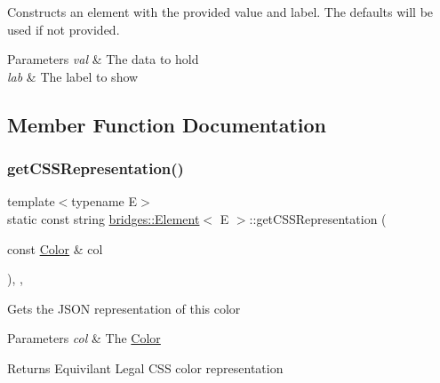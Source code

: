 Constructs an element with the provided value and label. The defaults will be used if not provided.


\begin{DoxyParams}{Parameters}
{\em val} & The data to hold \\
\hline
{\em lab} & The label to show \\
\hline
\end{DoxyParams}


\subsection{Member Function Documentation}
\mbox{\label{classbridges_1_1_element_a513b3409e4b689a390b0dcd50cc2d643}} 
\subsubsection{\texorpdfstring{get\+C\+S\+S\+Representation()}{getCSSRepresentation()}}
{\footnotesize\ttfamily template$<$typename E$>$ \\
static const string \mbox{\hyperlink{classbridges_1_1_element}{bridges\+::\+Element}}$<$ E $>$\+::get\+C\+S\+S\+Representation (\begin{DoxyParamCaption}\item[{const \mbox{\hyperlink{classbridges_1_1_color}{Color}} \&}]{col }\end{DoxyParamCaption})\hspace{0.3cm}{\ttfamily [inline]}, {\ttfamily [static]}, {\ttfamily [protected]}}

Gets the J\+S\+ON representation of this color


\begin{DoxyParams}{Parameters}
{\em col} & The \mbox{\hyperlink{classbridges_1_1_color}{Color}} \\
\hline
\end{DoxyParams}
\begin{DoxyReturn}{Returns}
Equivilant Legal C\+SS color representation 
\end{DoxyReturn}
\mbox{\label{classbridges_1_1_element_abfea1b7226b774be648e15f6b2c9daba}} 
